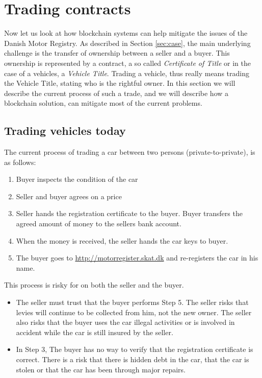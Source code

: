 \documentclass[oneside,a4paper,10pts,article]{memoir}
\begin{document}
\chapter{Trading contracts}
\label{sec:trading}
Now let us look at how blockchain systems can help mitigate the issues
of the Danish Motor Registry. As described in Section \ref{sec:case},
the main underlying challenge is the transfer of ownership between a
seller and a buyer. This ownership is represented by a contract, a so
called \emph{Certificate of Title} or in the case of a vehicles, a
\emph{Vehicle Title}. Trading a vehicle, thus really means trading the
Vehicle Title, stating who is the rightful owner. In this section we
will describe the current process of such a trade, and we will
describe how a blockchain solution, can mitigate most of the current
problems.

\section{Trading vehicles today}
The current process of trading a car between two persons
(private-to-private), is as follows:

\begin{enumerate}
\item Buyer inspects the condition of the car
\item Seller and buyer agrees on a price
\item Seller hands the registration certificate to the buyer. Buyer
  transfers the agreed amount of money to the sellers bank account.
\item When the money is received, the seller hands the car keys to buyer.
\item The buyer goes to \url{http://motorregister.skat.dk} and
  re-registers the car in his name.
\end{enumerate}
This process is risky for on both the seller and the buyer.
\begin{itemize}
\item The seller must trust that the buyer performs Step 5. The seller
  risks that levies will continue to be collected from him, not the
  new owner. The seller also risks that the buyer uses the car illegal
  activities or is involved in accident while the car is still insured
  by the seller.
\item In Step 3, The buyer has no way to verify that the registration
  certificate is correct. There is a risk that there is hidden debt in
  the car, that the car is stolen or that the car has been through
  major repairs.
\end{itemize}
\end{document}
